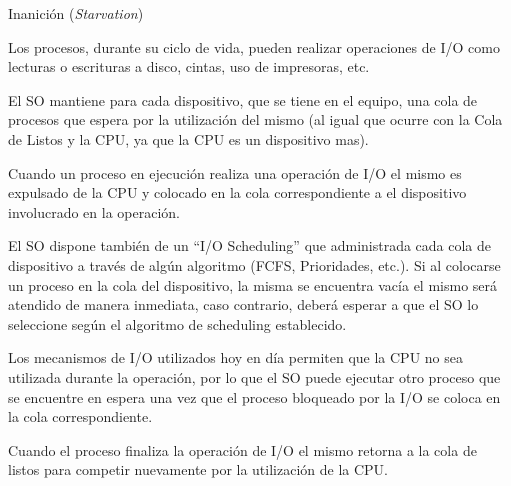 \begin{questions}
\question Inanición (\textit{Starvation})

\question Los procesos, durante su ciclo de vida, pueden realizar operaciones de I/O como lecturas o escrituras a disco, cintas, uso de impresoras, etc.

\hspace{20pt} El SO mantiene para cada dispositivo, que se tiene en el equipo, una cola de procesos que espera por la utilización del mismo (al igual que ocurre con la Cola de Listos y la CPU, ya que la CPU es un dispositivo mas).

\hspace{20pt} Cuando un proceso en ejecución realiza una operación de I/O el mismo es expulsado de la CPU y colocado en la cola correspondiente a el dispositivo involucrado en la operación.

\hspace{20pt} El SO dispone también de un “I/O Scheduling” que administrada cada cola de dispositivo a través de algún algoritmo (FCFS, Prioridades, etc.). Si al colocarse un proceso en la cola del dispositivo, la misma se encuentra vacía el mismo será atendido de manera inmediata, caso contrario, deberá esperar a que el SO lo seleccione según el algoritmo de scheduling establecido.

\hspace{20pt} Los mecanismos de I/O utilizados hoy en día permiten que la CPU no sea utilizada durante la operación, por lo que el SO puede ejecutar otro proceso que se encuentre en espera una vez que el proceso bloqueado por la I/O se coloca en la cola correspondiente.

\hspace{20pt} Cuando el proceso finaliza la operación de I/O el mismo retorna a la cola de listos para competir nuevamente por la utilización de la CPU.


\end{questions}
